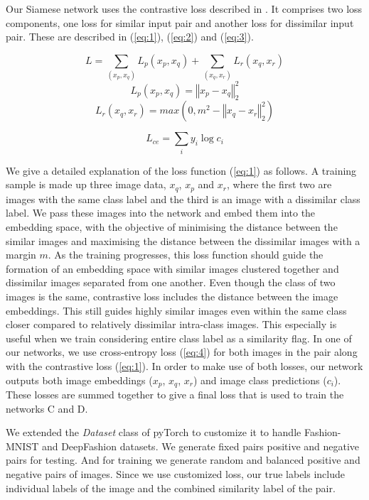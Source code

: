 \documentclass{article}
\begin{document}
Our Siamese network uses the contrastive loss described in \cite{bell2015learning}. It comprises two loss components, one loss for similar input pair and another loss for dissimilar input pair. These are described in (\ref{eq:1}), (\ref{eq:2}) and (\ref{eq:3}).

\begin{equation}
    L=\sum_{(x_p,x_q)}L_p(x_p,x_q) + \sum_{(x_q,x_r)}L_r(x_q,x_r)\label{eq:1}
\end{equation}
\begin{equation}
    L_p(x_p,x_q)=\left\Vert x_p - x_q \right\Vert^2_2\label{eq:2}
\end{equation}
\begin{equation}
    L_r(x_q,x_r)=max(0, m^2-\left\Vert x_q - x_r \right\Vert^2_2)\label{eq:3}
\end{equation}

\begin{equation}
    L_{ce}=\sum_{i}y_i\log c_i\label{eq:4}
\end{equation}

We give a detailed explanation of the loss function (\ref{eq:1}) as follows. A training sample is made up three image data, $x_q$, $x_p$ and $x_r$, where the first two are images with the same class label and the third is an image with a dissimilar class label. We pass these images into the network and embed them into the embedding space, with the objective of minimising the distance between the similar images and maximising the distance between the dissimilar images with a margin  $m$. As the training progresses, this loss function should guide the formation of an embedding space with similar images clustered together and dissimilar images separated from one another. Even though the class of two images is the same, contrastive loss includes the distance between the image embeddings. This still guides highly similar images even within the same class closer compared to relatively dissimilar intra-class images. This especially is useful when we train considering entire class label as a similarity flag. In one of our networks, we use cross-entropy loss (\ref{eq:4}) for both images in the pair along with the contrastive loss (\ref{eq:1}). In order to make use of both losses, our network outputs both image embeddings ($x_p$, $x_q$, $x_r$) and image class predictions ($c_i$). These losses are summed together to give a final loss that is used to train the networks C and D.

We extended the \textit{Dataset} class of pyTorch to customize it to handle Fashion-MNIST and DeepFashion datasets. We generate fixed pairs positive and negative pairs for testing. And for training we generate random and balanced positive and negative pairs of images. Since we use customized loss, our true labels include individual labels of the image and the combined similarity label of the pair.
\end{document}
